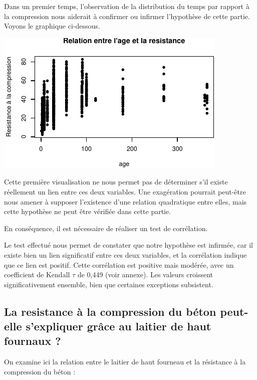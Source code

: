 \documentclass[
  12pt,
]{article}
\begin{document}
Dans un premier temps, l'observation de la distribution du temps par
rapport à la compression nous aiderait à confirmer ou infirmer
l'hypothèse de cette partie. Voyons le graphique ci-dessous.

\begin{center}\includegraphics{rmd_final_files/figure-latex/unnamed-chunk-11-1} \end{center}

Cette première visualisation ne nous permet pas de déterminer s'il
existe réellement un lien entre ces deux variables. Une exagération
pourrait peut-être nous amener à supposer l'existence d'une relation
quadratique entre elles, mais cette hypothèse ne peut être vérifiée dans
cette partie.

En conséquence, il est nécessaire de réaliser un test de corrélation.

Le test effectué nous permet de constater que notre hypothèse est
infirmée, car il existe bien un lien significatif entre ces deux
variables, et la corrélation indique que ce lien est positif. Cette
corrélation est positive mais modérée, avec un coefficient de Kendall
\(\tau\) de 0,449 (voir annexe). Les valeurs croissent significativement
ensemble, bien que certaines exceptions subsistent.

\subsection{La resistance à la compression du béton peut-elle
s'expliquer grâce au laitier de haut fournaux
?}\label{la-resistance-uxe0-la-compression-du-buxe9ton-peut-elle-sexpliquer-gruxe2ce-au-laitier-de-haut-fournaux}

On examine ici la relation entre le laitier de haut fourneau et la
résistance à la compression du béton :
\end{document}
